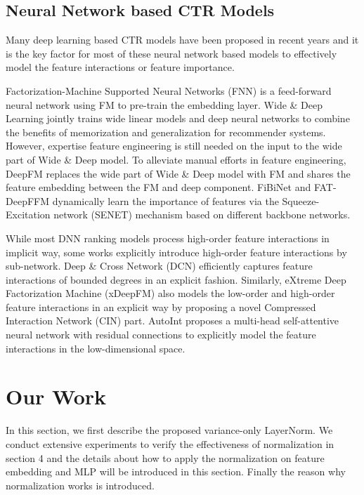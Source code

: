 \documentclass[sigconf]{acmart}
\begin{document}
\subsection{Neural Network based CTR Models}
Many deep learning based CTR models have been proposed in recent years and it is the key factor for most of these neural network based models to effectively model the feature interactions or feature importance.


Factorization-Machine Supported Neural Networks (FNN)\cite{zhang2016deep} is a feed-forward neural network using FM to pre-train the embedding layer. Wide \& Deep Learning\cite{cheng2016wide} jointly trains wide linear models and deep neural networks to combine the benefits of memorization and generalization for recommender systems. However, expertise feature engineering is still needed on the input to the wide part of Wide \& Deep model. To alleviate manual efforts in feature engineering, DeepFM\cite{guo2017deepfm} replaces the wide part of Wide \& Deep model with FM and shares the feature embedding between the FM and deep component. FiBiNet\cite{huang2019fibinet} and FAT-DeepFFM\cite{zhang2019fat} dynamically learn the importance of features via the Squeeze-Excitation network (SENET) mechanism based on different backbone networks.



While most DNN ranking models process high-order feature interactions in implicit way, some works explicitly introduce high-order feature interactions by sub-network. Deep \& Cross Network (DCN)\cite{wang2017deep} efficiently captures feature interactions of bounded degrees in an explicit fashion. Similarly, eXtreme Deep Factorization Machine (xDeepFM) \cite{lian2018xdeepfm} also models the low-order and high-order feature interactions in an explicit way by proposing a novel Compressed Interaction Network (CIN) part. AutoInt\cite{song2019autoint} proposes a multi-head self-attentive neural network with residual connections to explicitly model the feature interactions in the low-dimensional space.


\section{Our Work}
In this section, we first describe the proposed variance-only LayerNorm. We conduct extensive experiments to verify the effectiveness of normalization in section 4 and the details about how to apply the normalization on feature embedding and MLP will be introduced in this section. Finally the reason why normalization works is introduced.
\end{document}
